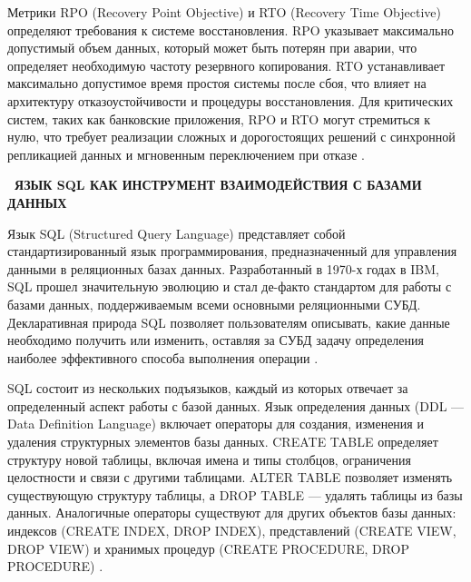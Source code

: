 \documentclass{SibFU-docs}
\begin{document}
Метрики RPO (Recovery Point Objective) и RTO (Recovery Time Objective) определяют требования к системе восстановления. RPO указывает максимально допустимый объем данных, который может быть потерян при аварии, что определяет необходимую частоту резервного копирования. RTO устанавливает максимально допустимое время простоя системы после сбоя, что влияет на архитектуру отказоустойчивости и процедуры восстановления. Для критических систем, таких как банковские приложения, RPO и RTO могут стремиться к нулю, что требует реализации сложных и дорогостоящих решений с синхронной репликацией данных и мгновенным переключением при отказе \cite{gray1993}.

\newpage
{}
\begin{center}\textbf{\thesection\ ЯЗЫК SQL КАК ИНСТРУМЕНТ ВЗАИМОДЕЙСТВИЯ С БАЗАМИ ДАННЫХ}\end{center}
\vspace*{-1.5em}


Язык SQL (Structured Query Language) представляет собой стандартизированный язык программирования, предназначенный для управления данными в реляционных базах данных. Разработанный в 1970-х годах в IBM, SQL прошел значительную эволюцию и стал де-факто стандартом для работы с базами данных, поддерживаемым всеми основными реляционными СУБД. Декларативная природа SQL позволяет пользователям описывать, какие данные необходимо получить или изменить, оставляя за СУБД задачу определения наиболее эффективного способа выполнения операции \cite{date2003}.


SQL состоит из нескольких подъязыков, каждый из которых отвечает за определенный аспект работы с базой данных. Язык определения данных (DDL — Data Definition Language) включает операторы для создания, изменения и удаления структурных элементов базы данных. CREATE TABLE определяет структуру новой таблицы, включая имена и типы столбцов, ограничения целостности и связи с другими таблицами. ALTER TABLE позволяет изменять существующую структуру таблицы, а DROP TABLE — удалять таблицы из базы данных. Аналогичные операторы существуют для других объектов базы данных: индексов (CREATE INDEX, DROP INDEX), представлений (CREATE VIEW, DROP VIEW) и хранимых процедур (CREATE PROCEDURE, DROP PROCEDURE) \cite{elmasri2016}.
\end{document}

